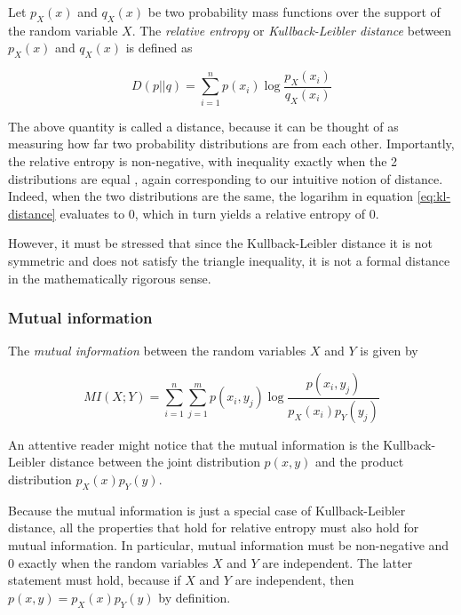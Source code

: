 \documentclass[12pt]{article}
\begin{document}
Let $p_X(x)$ and $q_X(x)$ be two probability mass functions over the support of the random variable $X$. The \textit{relative entropy} or \textit{Kullback-Leibler distance} \cite{cover-thomas} between $p_X(x)$ and $q_X(x)$ is defined as

\begin{equation}
D(p||q) = \sum_{i = 1}^n p(x_i) \log \frac{p_X(x_i)}{q_X(x_i)}
\label{eq:kl-distance}
\end{equation} 

The above quantity is called a distance, because it can be thought of as measuring how far two probability distributions are from each other. Importantly, the relative entropy is non-negative, with inequality exactly when the 2 distributions are equal \cite{cover-thomas}, again corresponding to our intuitive notion of distance. Indeed, when the two distributions are the same, the logarihm in equation \ref{eq:kl-distance} evaluates to 0, which in turn yields a relative entropy of 0. 

However, it must be stressed that since the Kullback-Leibler distance it is not symmetric and does not satisfy the triangle inequality, it is not a formal distance in the mathematically rigorous sense.

\subsubsection{Mutual information}

The \textit{mutual information} \cite{cover-thomas} between the random variables $X$ and $Y$ is given by 

\begin{equation}
MI(X;Y) = \sum_{i=1}^n \sum_{j=1}^m p(x_i,y_j) \log \frac{p(x_i,y_j)}{p_X(x_i)p_Y(y_j)}
\label{eq:mutual-inf}
\end{equation}

An attentive reader might notice that the mutual information is the Kullback-Leibler distance between the joint distribution $p(x,y)$ and the product distribution $p_X(x)p_Y(y)$.

Because the mutual information is just a special case of Kullback-Leibler distance, all the properties that hold for relative entropy must also hold for mutual information. In particular, mutual information must be non-negative and 0 exactly when the random variables $X$ and $Y$ are independent. The latter statement must hold, because if $X$ and $Y$ are independent, then $p(x,y) = p_X(x)p_Y(y)$ by definition. 
\end{document}
